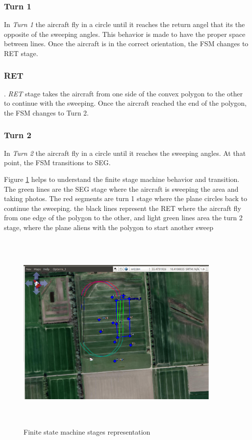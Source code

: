 \subsubsection{Turn 1}
In \textit{Turn 1} the aircraft fly in a circle until it reaches the return angel that its the opposite of the sweeping angles. This behavior is made to have the proper space between lines. Once the aircraft is in the correct orientation, the FSM changes to RET stage.
\subsubsection{RET}.
\textit{RET} stage takes the aircraft from one side of the convex polygon to the other to continue with the sweeping. Once the aircraft reached the end of the polygon, the FSM changes to Turn 2.
\subsubsection{Turn 2}
In \textit{Turn 2} the aircraft fly in a circle until it reaches the sweeping angles. At that point, the FSM transitions to SEG.

Figure \ref{fig:FSM_example} helps to understand the finite stage machine behavior and transition.  The green lines are the SEG stage where the aircraft is sweeping the area and taking photos.  The red segments are turn 1 stage where the plane circles back to continue the sweeping. the black lines represent the RET where the aircraft fly from one edge of the polygon to the other, and light green lines area the turn 2 stage, where the plane aliens with the polygon to start another sweep 
\begin{figure}[H]
\centering
\includegraphics[width=10cm,height=10cm,keepaspectratio]{imagenes/FSM_example.png}
\caption{Finite state machine stages representation}
\label{fig:FSM_example}
\end{figure}

